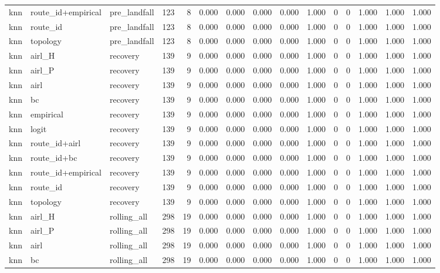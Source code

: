 \begin{tabular}{lllrrrrrrrrrrrr}
knn & route_id+empirical & pre_landfall & 123 & 8 & 0.000 & 0.000 & 0.000 & 0.000 & 1.000 & 0 & 0 & 1.000 & 1.000 & 1.000 \\
knn & route_id & pre_landfall & 123 & 8 & 0.000 & 0.000 & 0.000 & 0.000 & 1.000 & 0 & 0 & 1.000 & 1.000 & 1.000 \\
knn & topology & pre_landfall & 123 & 8 & 0.000 & 0.000 & 0.000 & 0.000 & 1.000 & 0 & 0 & 1.000 & 1.000 & 1.000 \\
knn & airl_H & recovery & 139 & 9 & 0.000 & 0.000 & 0.000 & 0.000 & 1.000 & 0 & 0 & 1.000 & 1.000 & 1.000 \\
knn & airl_P & recovery & 139 & 9 & 0.000 & 0.000 & 0.000 & 0.000 & 1.000 & 0 & 0 & 1.000 & 1.000 & 1.000 \\
knn & airl & recovery & 139 & 9 & 0.000 & 0.000 & 0.000 & 0.000 & 1.000 & 0 & 0 & 1.000 & 1.000 & 1.000 \\
knn & bc & recovery & 139 & 9 & 0.000 & 0.000 & 0.000 & 0.000 & 1.000 & 0 & 0 & 1.000 & 1.000 & 1.000 \\
knn & empirical & recovery & 139 & 9 & 0.000 & 0.000 & 0.000 & 0.000 & 1.000 & 0 & 0 & 1.000 & 1.000 & 1.000 \\
knn & logit & recovery & 139 & 9 & 0.000 & 0.000 & 0.000 & 0.000 & 1.000 & 0 & 0 & 1.000 & 1.000 & 1.000 \\
knn & route_id+airl & recovery & 139 & 9 & 0.000 & 0.000 & 0.000 & 0.000 & 1.000 & 0 & 0 & 1.000 & 1.000 & 1.000 \\
knn & route_id+bc & recovery & 139 & 9 & 0.000 & 0.000 & 0.000 & 0.000 & 1.000 & 0 & 0 & 1.000 & 1.000 & 1.000 \\
knn & route_id+empirical & recovery & 139 & 9 & 0.000 & 0.000 & 0.000 & 0.000 & 1.000 & 0 & 0 & 1.000 & 1.000 & 1.000 \\
knn & route_id & recovery & 139 & 9 & 0.000 & 0.000 & 0.000 & 0.000 & 1.000 & 0 & 0 & 1.000 & 1.000 & 1.000 \\
knn & topology & recovery & 139 & 9 & 0.000 & 0.000 & 0.000 & 0.000 & 1.000 & 0 & 0 & 1.000 & 1.000 & 1.000 \\
knn & airl_H & rolling_all & 298 & 19 & 0.000 & 0.000 & 0.000 & 0.000 & 1.000 & 0 & 0 & 1.000 & 1.000 & 1.000 \\
knn & airl_P & rolling_all & 298 & 19 & 0.000 & 0.000 & 0.000 & 0.000 & 1.000 & 0 & 0 & 1.000 & 1.000 & 1.000 \\
knn & airl & rolling_all & 298 & 19 & 0.000 & 0.000 & 0.000 & 0.000 & 1.000 & 0 & 0 & 1.000 & 1.000 & 1.000 \\
knn & bc & rolling_all & 298 & 19 & 0.000 & 0.000 & 0.000 & 0.000 & 1.000 & 0 & 0 & 1.000 & 1.000 & 1.000 \\

\end{tabular}
